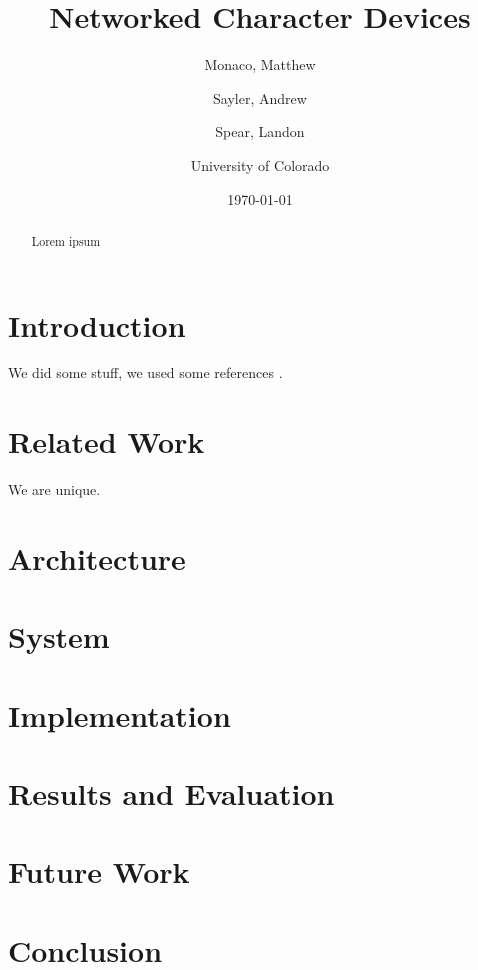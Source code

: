 \documentclass[11pt,twocolumn]{article}
\begin{document}
\title{Networked Character Devices}
\author{Monaco, Matthew \and Sayler, Andrew \and Spear, Landon
  \\ \and University of Colorado}
\date{\today}

\maketitle

\begin{abstract}
Lorem ipsum
\end{abstract}


\section{Introduction}

We did some stuff, we used some references \cite{ldd3}.

\section{Related Work}

We are unique.


\section{Architecture}

\section{System}

\section{Implementation}


\section{Results and Evaluation}

\section{Future Work}

\section{Conclusion}


\end{document}
